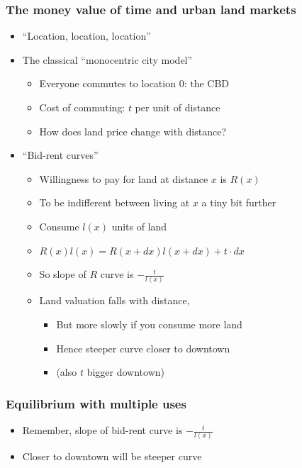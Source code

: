 \documentclass{beamer}
\begin{document}
\begin{frame}
	\frametitle{The money value of time and urban land markets}
	\begin{itemize}
		\item ``Location, location, location''
		\item The classical ``monocentric city model''
			\begin{itemize}
				\item Everyone commutes to location 0: the CBD
				\item Cost of commuting: $t$ per unit of distance
				\item How does land price change with distance?
			\end{itemize}
		\item ``Bid-rent curves''
			\begin{itemize}
				\item Willingness to pay for land at distance $x$ is $R(x)$
				\item To be indifferent between living at $x$ a tiny bit further
				\item Consume $l(x)$ units of land
				\item $R(x)l(x) = R(x+dx)l(x+dx) + t\cdot dx$
				\item So slope of $R$ curve is $-\frac{t}{l(x)}$
				\item Land valuation falls with distance, 
					\begin{itemize}
						\item But more slowly if you consume more land
						\item Hence steeper curve closer to downtown
						\item (also $t$ bigger downtown)
					\end{itemize}
			\end{itemize}
	\end{itemize}
\end{frame}

\begin{frame}
	\frametitle{Equilibrium with multiple uses}
	\begin{itemize}
		\item Remember, slope of bid-rent curve is $-\frac{t}{l(x)}$
		\item Closer to downtown will be steeper curve
	\end{itemize}
\end{frame}
\end{document}
